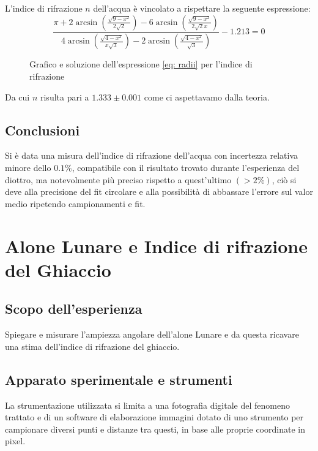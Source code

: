 \documentclass{report}[a4paper,11pt]
\begin{document}
L'indice di rifrazione $n$ dell'acqua è vincolato a rispettare la seguente espressione:
\begin{equation}\label{eq: radii}
\frac{\pi + 2\arcsin\left(\frac{\sqrt{9-x^2}}{2\sqrt{2}}\right) - 6\arcsin\left(\frac{\sqrt{9-x^2}}{2\sqrt{2}x}\right)}{4\arcsin\left(\frac{\sqrt{4-x^2}}{x\sqrt{3}}\right) - 2\arcsin\left(\frac{\sqrt{4-x^2}}{\sqrt{3}}\right)} -1.213 = 0
\end{equation}
\begin{figure}[H]
	\centering
		\scalebox{0.8}{}
	\caption{Grafico e soluzione dell'espressione \eqref{eq: radii} per l'indice di rifrazione \label{fig:ratio}}
\end{figure}
Da cui $n$ risulta pari a $1.333 \pm 0.001$ come ci aspettavamo dalla teoria.
\section{Conclusioni}
Si è data una misura dell'indice di rifrazione dell'acqua con incertezza relativa minore dello $0.1\%$, compatibile con il risultato trovato durante l'esperienza del diottro, ma notevolmente più preciso rispetto a quest'ultimo $(>2\%)$, ciò si deve alla precisione del fit circolare e alla possibilità di abbassare l'errore sul valor medio ripetendo campionamenti e fit. 
\chapter{Alone Lunare e Indice di rifrazione del Ghiaccio}
\section{Scopo dell'esperienza}
Spiegare e misurare l'ampiezza angolare dell'alone Lunare e da questa ricavare una stima dell'indice di rifrazione del ghiaccio.
\section{Apparato sperimentale e strumenti}
La strumentazione utilizzata si limita a una fotografia digitale del fenomeno trattato e di un software di elaborazione immagini\cite{gimp} dotato di uno strumento per campionare diversi punti e distanze tra questi, in base alle proprie coordinate in pixel.
\end{document}
